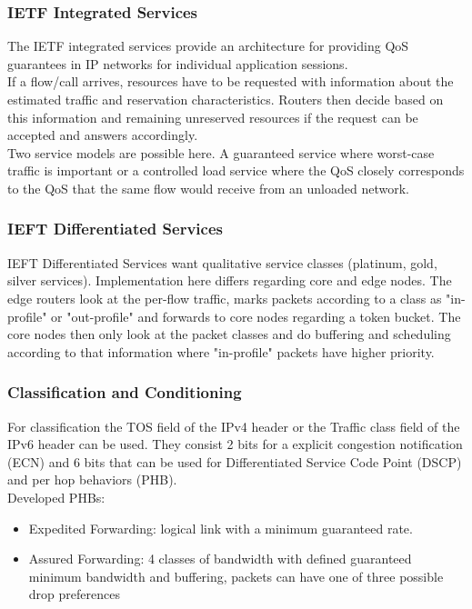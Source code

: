 \subsubsection*{IETF Integrated Services}
The IETF integrated services provide an architecture for providing QoS guarantees in IP networks for individual application sessions.\\
If a flow/call arrives, resources have to be requested with information about the estimated traffic and reservation characteristics.
Routers then decide based on this information and remaining unreserved resources if the request can be accepted and answers accordingly.\\
Two service models are possible here.
A guaranteed service where worst-case traffic is important or a controlled load service where the QoS closely corresponds to the QoS that the same flow would receive from an unloaded network.

\subsubsection*{IEFT Differentiated Services}
IEFT Differentiated Services want qualitative service classes (platinum, gold, silver services).
Implementation here differs regarding core and edge nodes.
The edge routers look at the per-flow traffic, marks packets according to a class as "in-profile" or "out-profile" and forwards to core nodes regarding a token bucket.
The core nodes then only look at the packet classes and do buffering and scheduling according to that information where "in-profile" packets have higher priority.

\subsubsection*{Classification and Conditioning}
For classification the TOS field of the IPv4 header or the Traffic class field of the IPv6 header can be used.
They consist 2 bits for a explicit congestion notification (ECN) and 6 bits that can be used for Differentiated Service Code Point (DSCP) and per hop behaviors (PHB).\\
Developed PHBs:
\begin{itemize}
  \item Expedited Forwarding: logical link with a minimum guaranteed rate.
  \item Assured Forwarding: 4 classes of bandwidth with defined guaranteed minimum bandwidth and buffering, packets can have one of three possible drop preferences
\end{itemize}
